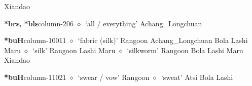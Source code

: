 \hspace{1ex}
         Xiandao 
  \item {\footnotesize \textbf{*brɛ, *blɛ}}{\tiny column-206}
         $\diamond$~`all / everything'
         Achang\_Longchuan 
  \item {\footnotesize \textbf{*buH}}{\tiny column-10011}
         $\diamond$~`fabric (silk)'
         Rangoon 
\hspace{1ex}
         Achang\_Longchuan 
\hspace{1ex}
         Bola 
\hspace{1ex}
         Lashi 
\hspace{1ex}
         Maru 
\hspace{1ex}
         $\diamond$~`silk'
         Rangoon 
\hspace{1ex}
         Lashi 
\hspace{1ex}
         Maru 
\hspace{1ex}
         $\diamond$~`silkworm'
         Rangoon 
\hspace{1ex}
         Bola 
\hspace{1ex}
         Lashi 
\hspace{1ex}
         Maru 
\hspace{1ex}
         Xiandao 
  \item {\footnotesize \textbf{*buH}}{\tiny column-11021}
         $\diamond$~`swear / vow'
         Rangoon 
\hspace{1ex}
         $\diamond$~`sweat'
         Atsi 
\hspace{1ex}
         Bola 
\hspace{1ex}
         Lashi 
\hspace{1ex}
